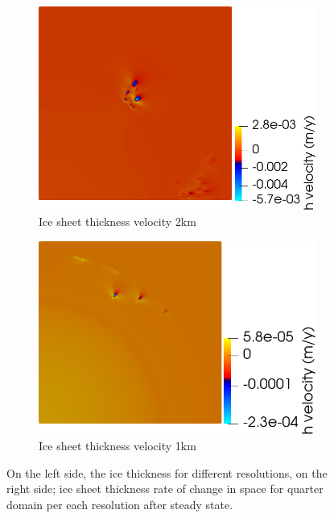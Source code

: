 \documentclass{article}
\begin{document}
\begin{figure}[!h]
\begin{minipage}[t]{.45\textwidth}
\begin{subfigure}{\textwidth}
			\includegraphics[width=\linewidth]{../fig/2km_quarter_cone_hvelocity_sin_fondo.png}
			\caption{Ice sheet thickness velocity 2km}
			\label{hvelocity2km}
		\end{subfigure}
				\begin{subfigure}{\textwidth}
			\includegraphics[width=\linewidth]{../fig/1km_quarter_cone_hvelocity_sin_fondo.png}
			\caption{Ice sheet thickness velocity 1km}
			\label{hvelocity1km}
		\end{subfigure}	
	\end{minipage}
	\caption{On the left side, the ice thickness for different resolutions, on the right side; ice sheet thickness rate of change in space for quarter domain per each resolution after steady state.}
	\label{h_and_h_velocities_cone}
\end{figure}
\end{document}
